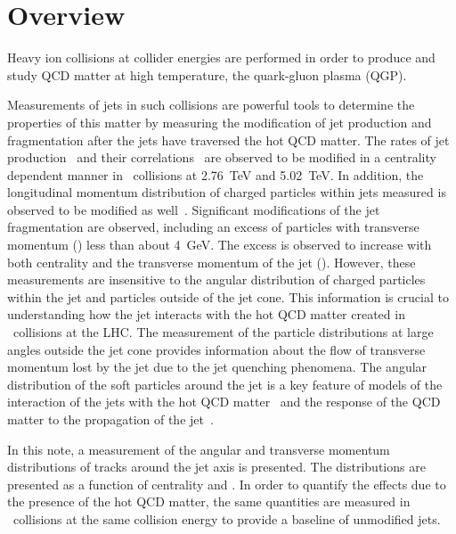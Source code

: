 
\section{Overview}

Heavy ion collisions at collider energies are performed in order to produce and study QCD matter at high temperature, the quark-gluon plasma (QGP).
 
Measurements of jets in such collisions are powerful tools to determine the properties of this matter by measuring the modification of jet production and fragmentation after the jets have traversed the hot QCD matter.
The rates of jet production~\cite{Abelev:2013kqa,Aad:2014bxa,Khachatryan:2016odn} and their correlations~\cite{Aad:2010bu} are observed to be modified in a centrality dependent manner in \PbPb\ collisions at 2.76~TeV and 5.02~TeV\cite{ATLAS:2017wvp}.
In addition, the longitudinal momentum distribution of charged particles within jets measured is observed to be modified as well~\cite{Aad:2014wha,Chatrchyan:2014ava, Aaboud:2017bzv,PbPb5TeVIntNote}.
Significant modifications of the jet fragmentation are observed, including an excess of particles with transverse momentum (\pT) less than about 4~GeV.
The excess is observed to increase with both centrality and the transverse momentum of the jet (\pTjet).
However, these measurements are insensitive to the angular distribution of charged particles within the jet and particles outside of the jet cone.
This information is crucial to understanding how the jet interacts with the hot QCD matter created in \pbpb\ collisions at the LHC.
The measurement of the particle distributions at large angles outside the jet cone provides information about the flow of transverse momentum lost by the jet due to the jet quenching phenomena.
The angular distribution of the soft particles around the jet is a key feature of models of the interaction of the jets with the hot QCD matter~\cite{Blaizot:2014ula,Brewer:2017fqy} and the response of the QCD matter to the propagation of the jet~\cite{Tachibana:2017syd,Yan:2017rku}.

In this note, a measurement of the angular and transverse momentum distributions of tracks around the jet axis is presented.
The distributions are presented as a function of centrality and \pTjet.
In order to quantify the effects due to the presence of the hot QCD matter, the same quantities are measured in \pp\ collisions at the same collision energy to provide a baseline of unmodified jets.

